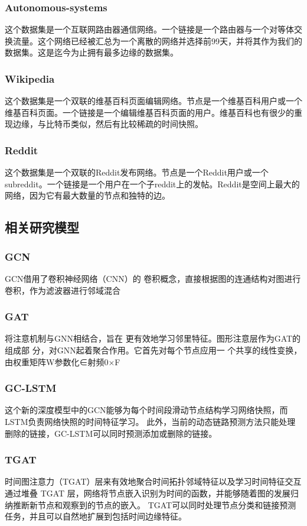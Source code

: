 \documentclass[conference]{IEEEtran}
\begin{document}
\subsubsection{Autonomous-systems}
这个数据集是一个互联网路由器通信网络。一个链接是一个路由器与一个对等体交换流量。这个网络已经被汇总为一个离散的网络并选择前99天，并将其作为我们的数据集。这是迄今为止拥有最多边缘的数据集。

\subsubsection{Wikipedia}
这个数据集是一个双联的维基百科页面编辑网络。节点是一个维基百科用户或一个维基百科页面。一个链接是一个编辑维基百科页面的用户。维基百科也有很少的重现边缘，与比特币类似，然后有比较稀疏的时间快照。

\subsubsection{Reddit}
这个数据集是一个双联的Reddit发布网络。节点是一个Reddit用户或一个subreddit。一个链接是一个用户在一个子reddit上的发帖。Reddit是空间上最大的网络，因为它有最大数量的节点和独特的边。


\subsection{相关研究模型}
\subsubsection{GCN}
GCN借用了卷积神经网络（CNN）的 卷积概念，直接根据图的连通结构对图进行卷积，作为滤波器进行邻域混合

\subsubsection{GAT}
将注意机制与GNN相结合，旨在 更有效地学习邻里特征。图形注意层作为GAT的组成部 分，对GNN起着聚合作用。它首先对每个节点应用一 个共享的线性变换，由权重矩阵W参数化∈射频0×F

\subsubsection{GC-LSTM}
这个新的深度模型中的GCN能够为每个时间段滑动节点结构学习网络快照，而LSTM负责网络快照的时间特征学习。
此外，当前的动态链路预测方法只能处理删除的链接，GC-LSTM可以同时预测添加或删除的链接。

\subsubsection{TGAT}
时间图注意力（TGAT）层来有效地聚合时间拓扑邻域特征以及学习时间特征交互通过堆叠 TGAT 层，网络将节点嵌入识别为时间的函数，并能够随着图的发展归纳推断新节点和观察到的节点的嵌入。
TGAT可以同时处理节点分类和链接预测任务，并且可以自然地扩展到包括时间边缘特征。
\end{document}
